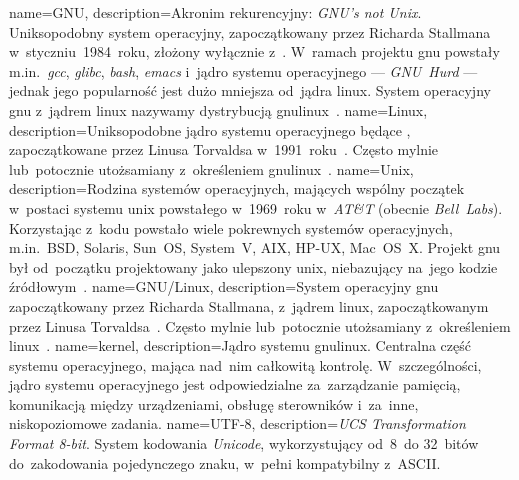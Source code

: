 


{
	name={GNU},
	description={Akronim rekurencyjny: \emph{GNU’s not Unix}. Uniksopodobny system operacyjny, zapoczątkowany przez Richarda Stallmana w~styczniu~1984~roku, złożony wyłącznie z~. W~ramach projektu \gls{gnu} powstały m.in.~\emph{gcc}, \emph{glibc}, \emph{bash}, \emph{emacs} i~jądro systemu operacyjnego --- \emph{GNU~Hurd} --- jednak jego popularność jest dużo mniejsza od~jądra \gls{linux}. System operacyjny \gls{gnu} z~jądrem \gls{linux} nazywamy dystrybucją \gls{gnulinux}~\cite{gnu,gnulinux,gnu-faq,wiki:linux-naming-controversy}.}
}
{
	name={Linux},
	description={Uniksopodobne jądro systemu operacyjnego będące , zapoczątkowane przez Linusa Torvaldsa w~1991~roku~\cite{linux-kernel}. Często mylnie lub~potocznie utożsamiany z~określeniem \gls{gnulinux}~\cite{gnu-faq,wiki:linux-naming-controversy}.}
}
{
	name={Unix},
	description={Rodzina systemów operacyjnych, mających wspólny początek w~postaci systemu \gls{unix} powstałego w~1969~roku w~\emph{AT\&T} (obecnie \emph{Bell~Labs}). Korzystając z~kodu  powstało wiele pokrewnych systemów operacyjnych, m.in.~BSD, Solaris, Sun~OS, System~V, AIX, HP-UX, Mac~OS~X. Projekt \gls{gnu} był od~początku projektowany jako ulepszony \gls{unix}, niebazujący na~jego kodzie źródłowym~\cite{gnu-initial-msg}.}
}
{
	name={GNU/Linux},
	description={System operacyjny \gls{gnu} zapoczątkowany przez Richarda Stallmana, z~jądrem \gls{linux}, zapoczątkowanym przez Linusa Torvaldsa~\cite{gnulinux}. Często mylnie lub~potocznie utożsamiany z~określeniem \gls{linux}~\cite{gnu-faq,wiki:linux-naming-controversy}.}
}
{
	name={kernel},
	description={Jądro systemu \gls{gnulinux}. Centralna część systemu operacyjnego, mająca nad~nim całkowitą kontrolę. W~szczególności, jądro systemu operacyjnego jest odpowiedzialne za~zarządzanie pamięcią, komunikacją między urządzeniami, obsługę sterowników i~za~inne, niskopoziomowe zadania.}
}
{
	name={UTF-8},
	description={\emph{UCS Transformation Format 8-bit}. System kodowania \emph{Unicode}, wykorzystujący od~8~do 32~bitów do~zakodowania pojedynczego znaku, w~pełni kompatybilny z~\gls{ASCII}.}
}
